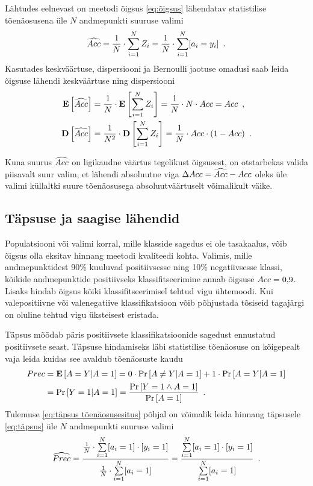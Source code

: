 Lähtudes eelnevast on meetodi õigsus \eqref{eq:õigsus} lähendatav statistilise tõenäosusena üle $N$ andmepunkti suuruse valimi
\begin{equation}
    \label{eq:õigsus lähend}
    \widehat{Acc}=\frac{1}{N}\cdot\sum^{N}_{i = 1}Z_i=\frac{1}{N}\cdot\sum^{N}_{i = 1}[a_i=y_i] \enspace.
\end{equation}
Kasutades keskväärtuse, dispersiooni ja Bernoulli jaotuse omadusi saab leida õigsuse lähendi keskväärtuse ning dispersiooni
\begin{align*}
    \operatorname*{\mathbf{E}}\left[\widehat{Acc}\right]&=\frac{1}{N}\cdot\operatorname*{\mathbf{E}}\left[\sum^{N}_{i=1}Z_i\right]=\frac{1}{N}\cdot N\cdot Acc=Acc \enspace, \\
    \operatorname*{\mathbf{D}}\left[\widehat{Acc}\right]&=\frac{1}{N^2}\cdot\operatorname*{\mathbf{D}}\left[\sum^{N}_{i=1}Z_i\right]=\frac{1}{N}\cdot Acc\cdot(1-Acc) \enspace.
\end{align*}

Kuna suurus $\widehat{Acc}$ on ligikaudne väärtus tegelikust õigsusest, on otstarbekas valida piisavalt suur valim, et lähendi absoluutne viga $\Delta Acc=\widehat{Acc}-Acc$ oleks üle valimi küllaltki suure tõenäosusega absoluutväärtuselt võimalikult väike.

\subsection{Täpsuse ja saagise lähendid}
Populatsiooni või valimi korral, mille klasside sagedus ei ole tasakaalus, võib õigsus olla eksitav hinnang meetodi kvaliteedi kohta. Valimis, mille andmepunktidest 90\% kuuluvad positiivsesse ning 10\% negatiivsesse klassi, kõikide andmepunktide positiivseks klassifitseerimine annab õigsuse $Acc=0{,}9$. Lisaks hindab õigsus kõiki klassifitseerimisel tehtud vigu ühtemoodi. Kui valepositiivne või valenegatiive klassifikatsioon võib põhjustada tõsiseid tagajärgi on oluline tehtud vigu üksteisest eristada.

Täpsus mõõdab päris positiivsete klassifikatsioonide sagedust ennustatud positiivsete seast. Täpsuse hindamiseks läbi statistilise tõenäosuse on kõigepealt vaja leida kuidas see avaldub tõenäosuste kaudu
\begin{align}
    Prec&=\operatorname*{\mathbf{E}}\left[A=Y|A=1\right]=0\cdot\Pr\left[A\neq Y|A=1\right]+1\cdot\Pr\left[A=Y|A=1\right] \nonumber\\
    &=\Pr\left[Y=1|A=1\right]=\frac{\Pr\left[Y=1\land A=1\right]}{\Pr\left[A=1\right]} \enspace. \label{eq:täpsus tõenäosusesitus}
\end{align}
Tulemuse \eqref{eq:täpsus tõenäosusesitus} põhjal on võimalik leida hinnang täpsusele \eqref{eq:täpsus} üle $N$ andmepunkti suuruse valimi
\begin{equation}
    \label{eq:täpsus lähend}
    \widehat{Prec}=\frac{\frac{1}{N}\cdot\sum\limits_{i=1}^{N}[a_i=1]\cdot[y_i=1]}{\frac{1}{N}\cdot\sum\limits_{i=1}^{N}[a_i=1]}=\frac{\sum\limits_{i=1}^{N}[a_i=1]\cdot[y_i=1]}{\sum\limits_{i=1}^{N}[a_i=1]}\enspace.
\end{equation}

